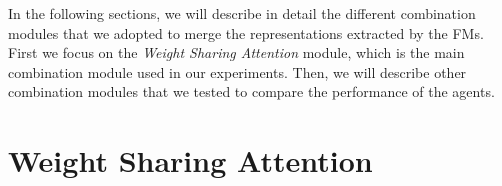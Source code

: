 In the following sections, we will describe in detail the different combination modules that we adopted to merge the representations extracted by the FMs.
First we focus on the \textit{Weight Sharing Attention} module, which is the main combination module used in our experiments.
Then, we will describe other combination modules that we tested to compare the performance of the agents.

\section{Weight Sharing Attention}
\label{sec:wsa}





